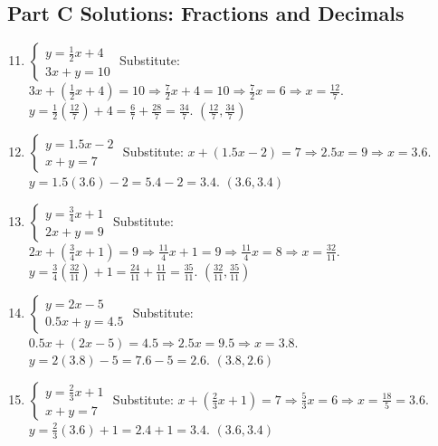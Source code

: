 \documentclass[12pt]{article}
\begin{document}
\subsection*{Part C Solutions: Fractions and Decimals}
\begin{enumerate}
    \setcounter{enumi}{10}
    \item \(\begin{cases} y = \tfrac{1}{2}x + 4 \\ 3x + y = 10 \end{cases}\)  
    Substitute: \(3x + (\tfrac{1}{2}x + 4) = 10 \Rightarrow \tfrac{7}{2}x + 4 = 10 \Rightarrow \tfrac{7}{2}x = 6 \Rightarrow x = \tfrac{12}{7}\).  
    \(y = \tfrac{1}{2}(\tfrac{12}{7}) + 4 = \tfrac{6}{7} + \tfrac{28}{7} = \tfrac{34}{7}\).  
    \(\boxed{(\tfrac{12}{7}, \tfrac{34}{7})}\)

    \item \(\begin{cases} y = 1.5x - 2 \\ x + y = 7 \end{cases}\)  
    Substitute: \(x + (1.5x - 2) = 7 \Rightarrow 2.5x = 9 \Rightarrow x = 3.6\).  
    \(y = 1.5(3.6) - 2 = 5.4 - 2 = 3.4\).  
    \(\boxed{(3.6, 3.4)}\)

    \item \(\begin{cases} y = \tfrac{3}{4}x + 1 \\ 2x + y = 9 \end{cases}\)  
    Substitute: \(2x + (\tfrac{3}{4}x + 1) = 9 \Rightarrow \tfrac{11}{4}x + 1 = 9 \Rightarrow \tfrac{11}{4}x = 8 \Rightarrow x = \tfrac{32}{11}\).  
    \(y = \tfrac{3}{4}(\tfrac{32}{11}) + 1 = \tfrac{24}{11} + \tfrac{11}{11} = \tfrac{35}{11}\).  
    \(\boxed{(\tfrac{32}{11}, \tfrac{35}{11})}\)

    \item \(\begin{cases} y = 2x - 5 \\ 0.5x + y = 4.5 \end{cases}\)  
    Substitute: \(0.5x + (2x - 5) = 4.5 \Rightarrow 2.5x = 9.5 \Rightarrow x = 3.8\).  
    \(y = 2(3.8) - 5 = 7.6 - 5 = 2.6\).  
    \(\boxed{(3.8, 2.6)}\)

    \item \(\begin{cases} y = \tfrac{2}{3}x + 1 \\ x + y = 7 \end{cases}\)  
    Substitute: \(x + (\tfrac{2}{3}x + 1) = 7 \Rightarrow \tfrac{5}{3}x = 6 \Rightarrow x = \tfrac{18}{5} = 3.6\).  
    \(y = \tfrac{2}{3}(3.6) + 1 = 2.4 + 1 = 3.4\).  
    \(\boxed{(3.6, 3.4)}\)
\end{enumerate}
\end{document}
